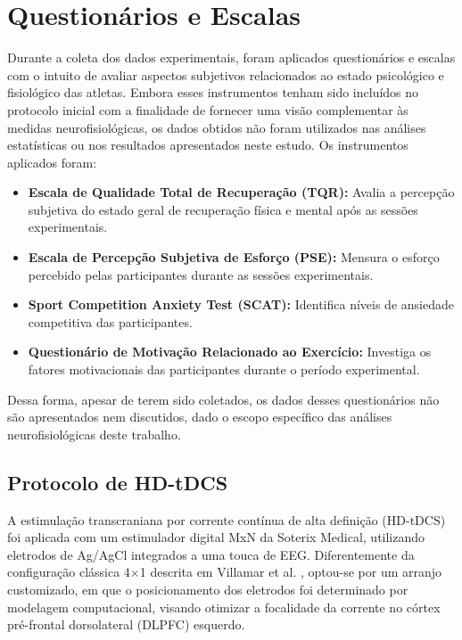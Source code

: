\section{Questionários e Escalas}

Durante a coleta dos dados experimentais, foram aplicados questionários e escalas com o intuito de avaliar aspectos subjetivos relacionados ao estado psicológico e fisiológico das atletas. Embora esses instrumentos tenham sido incluídos no protocolo inicial com a finalidade de fornecer uma visão complementar às medidas neurofisiológicas, os dados obtidos não foram utilizados nas análises estatísticas ou nos resultados apresentados neste estudo. Os instrumentos aplicados foram:

\begin{itemize}
    \item \textbf{Escala de Qualidade Total de Recuperação (TQR):} Avalia a percepção subjetiva do estado geral de recuperação física e mental após as sessões experimentais.
    \item \textbf{Escala de Percepção Subjetiva de Esforço (PSE):} Mensura o esforço percebido pelas participantes durante as sessões experimentais.
    \item \textbf{Sport Competition Anxiety Test (SCAT):} Identifica níveis de ansiedade competitiva das participantes.
    \item \textbf{Questionário de Motivação Relacionado ao Exercício:} Investiga os fatores motivacionais das participantes durante o período experimental.
\end{itemize}

Dessa forma, apesar de terem sido coletados, os dados desses questionários não são apresentados nem discutidos, dado o escopo específico das análises neurofisiológicas deste trabalho.

\subsection{Protocolo de HD-tDCS}
\label{subsec:hdtdcs_protocol}

A estimulação transcraniana por corrente contínua de alta definição (HD-tDCS) foi aplicada com um estimulador digital MxN da Soterix Medical, utilizando eletrodos de Ag/AgCl integrados a uma touca de EEG. Diferentemente da configuração clássica 4$\times$1 descrita em Villamar et al. \cite{villamar2013hdtdcs}, optou-se por um arranjo customizado, em que o posicionamento dos eletrodos foi determinado por modelagem computacional, visando otimizar a focalidade da corrente no córtex pré-frontal dorsolateral (DLPFC) esquerdo.

